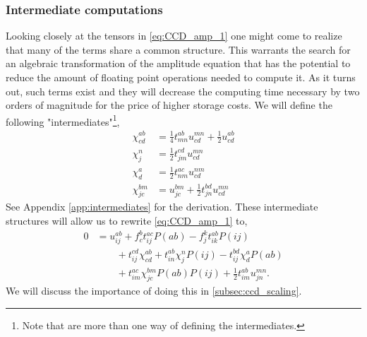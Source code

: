 \documentclass[
    a4paper, aps, twocolumn, floatfix, superscriptaddress,
    nofootinbib]{revtex4-1}
\newcommand{\1}{\mathds{1}}
\begin{document}
        \subsubsection{Intermediate computations}
            Looking closely at the tensors in \autoref{eq:CCD_amp_1} one might
            come to realize that many of the terms share a common structure.
            This warrants the search for an algebraic transformation of the
            amplitude equation that has the potential to reduce the amount of
            floating point operations needed to compute it. As it turns out,
            such terms exist and they will decrease the computing time necessary
            by two orders of magnitude for the price of higher storage costs.
            We will define the following "intermediates"\footnote{Note that are
            more than one way of defining the intermediates.},
            \begin{align}
                \label{eq:intermediate1}
                \chi^{ab}_{cd}
                &= \frac{1}{4}t^{ab}_{mn} u^{mn}_{cd}
                + \frac{1}{2}u^{ab}_{cd} \\
                \label{eq:intermediate2}
                \chi^n_j &= \frac{1}{2}t^{cd}_{jm} u^{mn}_{cd} \\
                \label{eq:intermediate3}
                \chi^a_d &= \frac{1}{2} t^{ac}_{nm} u^{nm}_{cd} \\
                \label{eq:intermediate4}
                \chi^{bm}_{jc}
                &= u^{bm}_{jc} + \frac{1}{2}t^{bd}_{jn}u^{mn}_{cd}
            \end{align}
            See Appendix \ref{app:intermediates} for the derivation.  These
            intermediate structures will allow us to rewrite
            \autoref{eq:CCD_amp_1} to,
            \begin{equation}
                \begin{aligned}
                    0 &= u^{ab}_{ij} + f^b_c t^{ac}_{ij}P(ab)
                    - f^k_jt^{ab}_{ik}P(ij) \\
                    &\qquad
                    + t^{cd}_{ij}\chi^{ab}_{cd} + t^{ab}_{in}\chi^n_jP(ij)
                    - t^{bd}_{ij}\chi^a_dP(ab) \\
                    &\qquad
                    + t^{ac}_{im}\chi^{bm}_{jc}P(ab)P(ij)
                    + \frac{1}{2}t^{ab}_{im}u^{mn}_{jn}.
                \end{aligned}
            \end{equation}
            We will discuss the importance of doing this in
            \autoref{subsec:ccd_scaling}.
\end{document}
